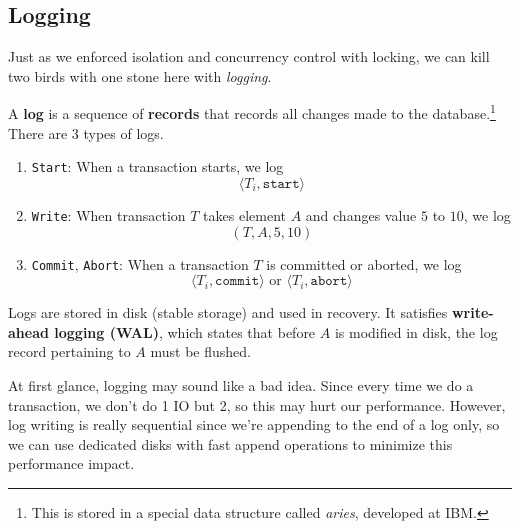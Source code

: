   \subsection{Logging} 

    Just as we enforced isolation and concurrency control with locking, we can kill two birds with one stone here with \textit{logging}. 

    \begin{definition}[Log]
      \label{def:log}
      A \textbf{log} is a sequence of \textbf{records} that records all changes made to the database.\footnote{This is stored in a special data structure called \textit{aries}, developed at IBM.} There are 3 types of logs.
      \begin{enumerate}
        \item \texttt{Start}: When a transaction starts, we log 
          \begin{equation}
            \langle T_i, \texttt{start} \rangle
          \end{equation}
        \item \texttt{Write}: When transaction $T$ takes element $A$ and changes value $5$ to $10$, we log 
          \begin{equation}
            (T, A, 5, 10)
          \end{equation}
        \item \texttt{Commit}, \texttt{Abort}: When a transaction $T$ is committed or aborted, we log 
          \begin{equation}
            \langle T_i , \texttt{commit} \rangle \text{ or } \langle T_i , \texttt{abort} \rangle
          \end{equation}
      \end{enumerate}
      Logs are stored in disk (stable storage) and used in recovery. 
      It satisfies \textbf{write-ahead logging (WAL)}, which states that before $A$ is modified in disk, the log record pertaining to $A$ must be flushed. 
    \end{definition}

    At first glance, logging may sound like a bad idea. Since every time we do a transaction, we don't do 1 IO but 2, so this may hurt our performance. However, log writing is really sequential since we're appending to the end of a log only, so we can use dedicated disks with fast append operations to minimize this performance impact. 

